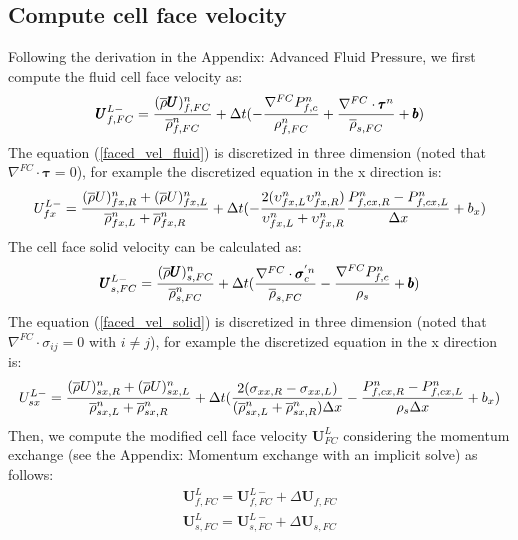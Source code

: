 \documentclass[preprint,12pt]{elsarticle}
\begin{document}
\subsection{\textsf{Compute cell face velocity}}
Following the derivation in the Appendix: Advanced Fluid Pressure, we first compute the fluid cell face velocity as:
%
%
\begin{equation}
\label{faced_vel_fluid}
    \pmb{U}_{f,FC}^{L-} = \frac{(\overline{\rho} \pmb{U})_{f,FC}^n}{\overline{\rho}_{f,FC}^n} + \Delta{t} (-\frac{\nabla^{FC} P_{f,c}^n}{\rho_{f,FC}^n}  +\frac{\nabla^{FC} \cdot \pmb{\tau}^{n}}{\overline{\rho}_{s,FC}}+ \pmb{b})
\end {equation}
%
%
The equation (\ref{faced_vel_fluid}) is discretized in three dimension (noted that $\nabla^{FC} \cdot \pmb{\tau} = 0$), for example the discretized equation in the x direction is:
%
\begin{equation}
U_{fx}^{L-} = \frac{(\overline{\rho} U)_{fx,R}^n + (\overline{\rho} U)_{fx,L}^n}{\overline{\rho}_{fx,L}^n + \overline{\rho}_{fx,R}^n} + \Delta{t} (-\frac{2(\upsilon_{fx,L}^n \upsilon_{fx,R}^n)}{\upsilon_{fx,L}^n + \upsilon_{fx,R}^n} \frac{P_{f,cx,R}^n - P_{f,cx,L}^n}{\Delta x} + b_x)
\end {equation}
%
%
The cell face solid velocity can be calculated as:
\begin{equation}
\label{faced_vel_solid}
\pmb{U}_{s,FC}^{L-} = \frac{(\overline{\rho} \pmb{U})_{s,FC}^n}{\overline{\rho}_{s,FC}^n} + \Delta{t} ( \frac{\nabla^{FC} \cdot \pmb{\sigma}_c^{'n}}{\overline{\rho}_{s,FC}}    - \frac{\nabla^{FC} P_{f,c}^n}{\rho_s}   + \pmb{b})
\end {equation}
The equation (\ref{faced_vel_solid}) is discretized in three dimension (noted that $\nabla^{FC} \cdot \sigma_{ij} = 0$ with $i \neq j$), for example the discretized equation in the x direction is:
%
\begin{equation}
U_{sx}^{L-} = \frac{(\overline{\rho} U)_{sx,R}^n + (\overline{\rho} U)_{sx,L}^n}{\overline{\rho}_{sx,L}^n + \overline{\rho}_{sx,R}^n} + \Delta{t} (\frac{2(\sigma_{xx,R} - \sigma_{xx,L})}{(\overline{\rho}_{sx,L}^n + \overline{\rho}_{sx,R}^n)\Delta x}-\frac{P_{f,cx,R}^n - P_{f,cx,L}^n}{\rho_s \Delta x} + b_x)
\end {equation}
%
%
Then, we compute the modified cell face velocity $\pmb{U}_{FC}^{L}$ considering the momentum exchange (see the Appendix: Momentum exchange with an implicit solve) as follows:
%
\begin{equation}
\begin{gathered}
   \pmb{U}_{f,FC}^{L} = \pmb{U}_{f,FC}^{L-} + \Delta \pmb{U}_{f,FC}\\
   \pmb{U}_{s,FC}^{L} = \pmb{U}_{s,FC}^{L-} + \Delta \pmb{U}_{s,FC}
\end {gathered}
\end {equation}
\end{document}
